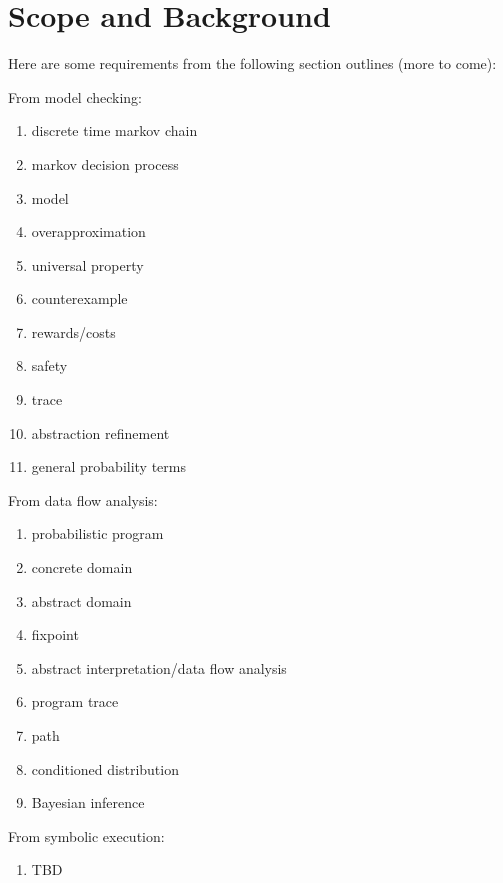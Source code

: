 \section{Scope and Background}
\label{sec:background}

Here are some requirements from the following section outlines (more to come):

From model checking:
  \begin{enumerate}
   \item discrete time markov chain
   \item markov decision process
   \item model
   \item overapproximation
   \item universal property
   \item counterexample
   \item rewards/costs
   \item safety
   \item trace
   \item abstraction refinement
   \item general probability terms
  \end{enumerate}

From data flow analysis:
\begin{enumerate}
 \item probabilistic program
 \item concrete domain
 \item abstract domain
 \item fixpoint
 \item abstract interpretation/data flow analysis
 \item program trace
 \item path
 \item conditioned distribution
 \item Bayesian inference
\end{enumerate}

From symbolic execution:
\begin{enumerate}
 \item TBD
\end{enumerate}



